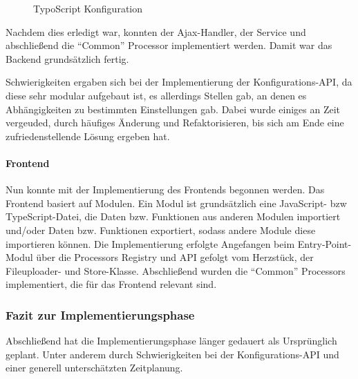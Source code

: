 \begin{figure}[htb]
\centering
\caption{TypoScript Konfiguration}
\label{fig:typoscript}
\end{figure}

Nachdem dies erledigt war, konnten der Ajax-Handler, der Service und abschließend die ``Common'' Processor implementiert werden. Damit war das Backend grundsätzlich fertig.

Schwierigkeiten ergaben sich bei der Implementierung der Konfigurations-API, da diese sehr modular aufgebaut ist, es allerdings Stellen gab, an denen es Abhängigkeiten zu bestimmten Einstellungen gab. Dabei wurde einiges an Zeit vergeuded, durch häufiges Änderung und Refaktorisieren, bis sich am Ende eine zufriedenstellende Lösung ergeben hat.

\paragraph{Frontend} Nun konnte mit der Implementierung des Frontends begonnen werden. Das Frontend basiert auf Modulen. Ein Modul ist grundsätzlich eine JavaScript- bzw TypeScript-Datei, die Daten bzw. Funktionen aus anderen Modulen importiert und/oder Daten bzw. Funktionen exportiert, sodass andere Module diese importieren können. Die Implementierung erfolgte Angefangen beim Entry-Point-Modul über die Processors Registry und API gefolgt vom Herzstück, der Fileuploader- und  Store-Klasse. Abschließend wurden die ``Common'' Processors implementiert, die für das Frontend relevant sind.

\subsubsection{Fazit zur Implementierungsphase}
\label{sec:FazitImplementierung}

Abschließend hat die Implementierungsphase länger gedauert als Ursprünglich geplant. Unter anderem durch Schwierigkeiten bei der Konfigurations-API und einer generell unterschätzten Zeitplanung.